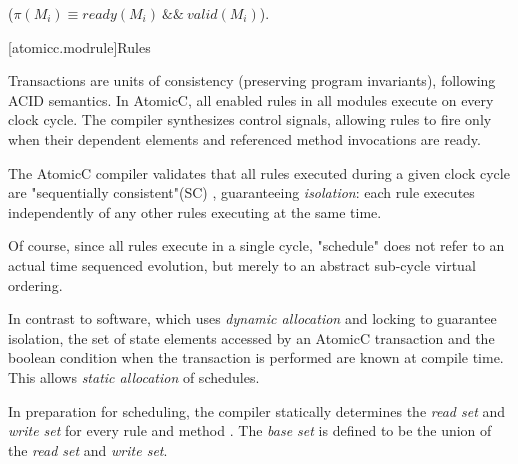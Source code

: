  ($\pi(M_{i}) \equiv ready(M_{i})\ \&\&\ valid(M_{i})$).

[atomicc.modrule]{Rules}

Transactions are units of consistency (preserving program invariants), following ACID semantics.
In AtomicC, all enabled rules in all modules execute on every clock cycle.
The compiler synthesizes control signals, allowing rules to fire
only when their dependent elements and referenced method invocations are ready.

The AtomicC compiler
validates that all rules executed during a given clock cycle are
"sequentially consistent"(SC) \cite{Lamport:1979:MMC:1311099.1311750},
guaranteeing \textit{isolation}\cite[Sec.~7.1]{GrayR93}: each rule executes
independently of any other rules executing at the same time.

Of course, since all rules execute in a single cycle, "schedule" does not
refer to an actual time sequenced evolution, but merely to an abstract sub-cycle
virtual ordering.

In contrast to software, which uses \textit{dynamic allocation}\cite[p.~377]{GrayR93}
and locking\cite[Sec.~11.2]{OV11} to guarantee isolation,
the set of state elements accessed by an AtomicC transaction
and the boolean condition when the transaction is performed
are known at compile time.
This allows \textit{static allocation}\cite[Sec.~7.3.1]{GrayR93} of schedules.

In preparation for scheduling, the compiler statically determines the
\textit{read set} and \textit{write set}
for every rule and method \cite[Sec.~10.1.2]{OV11} \cite{RosenkrantzSternsLewis}.
The \textit{base set} is defined to be
the union of the \textit{read set} and \textit{write set}.


